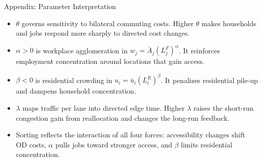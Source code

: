 \documentclass[11pt,aspectratio=169]{beamer}
\newcommand{\navback}[1]{\par\vspace{0.35em}\noindent\hfill\hyperlink{#1}{\beamerreturnbutton{back}}}
\begin{document}
\begin{frame}[label=appparams]{Appendix: Parameter Interpretation}
\begin{itemize}\small
  \item $\theta$ governs sensitivity to bilateral commuting costs. Higher $\theta$ makes households and jobs respond more sharply to directed cost changes.
  \item $\alpha>0$ is workplace agglomeration in $w_j=\bar A_j(L_j^F)^\alpha$. It reinforces employment concentration around locations that gain access.
  \item $\beta<0$ is residential crowding in $u_i=\bar u_i(L_i^R)^\beta$. It penalizes residential pile-up and dampens household concentration.
  \item $\lambda$ maps traffic per lane into directed edge time. Higher $\lambda$ raises the short-run congestion gain from reallocation and changes the long-run feedback.
  \item Sorting reflects the interaction of all four forces: accessibility changes shift OD costs, $\alpha$ pulls jobs toward stronger access, and $\beta$ limits residential concentration.
\end{itemize}
\navback{estparams}
\end{frame}
\end{document}
